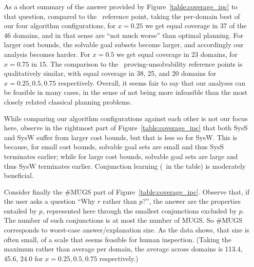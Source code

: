 As a short summary of the answer provided by
Figure~\ref{table:coverage_ipc} to that question, compared to
the \hlmcut\ reference point, taking the per-domain best of our four
algorithm configurations, for $x=0.25$ we get equal coverage in 37 of
the 46 domains, and in that sense are ``not much worse'' than optimal
planning. For larger cost bounds, the solvable goal subsets become
larger, and accordingly our analysis becomes harder. For $x=0.5$ we
get equal coverage in 23 domains, for $x=0.75$ in 15. The comparison
to the \hc\ proving-unsolvability reference points is qualitatively
similar, with equal coverage in 38, 25, and 20 domains for $x=0.25,
0.5, 0.75$ respectively. Overall, it seems fair to say that our
analyses can be feasible in many cases, in the sense of not being more
infeasible than the most closely related classical planning problems.

While comparing our algorithm configurations against each other is not
our focus here, observe in the rightmost part of
Figure~\ref{table:coverage_ipc} that both SysS and SysW suffer from
larger cost bounds, but that is less so for SysW. This is because, for
small cost bounds, solvable goal sets are small and thus SysS
terminates earlier; while for large cost bounds, solvable goal sets
are large and thus SysW terminates earlier. Conjunction learning (\hc\
in the table) is moderately beneficial.
%
%

Consider finally the \#MUGS part of
Figure~\ref{table:coverage_ipc}. Observe that, if the user asks a
question ``Why $r$ rather than $p$?'', the answer are the properties
entailed by $p$, represented here through the smallest conjunctions
excluded by $p$. The number of such conjunctions is at most the number
of MUGS. So \#MUGS corresponds to worst-case answer/explanation
size. As the data shows, that size is often small, of a scale that
seems feasible for human inspection. (Taking the maximum rather than
average per domain, the average across domains is 113.4, 45.6, 24.0
for $x=0.25, 0.5, 0.75$ respectively.)

